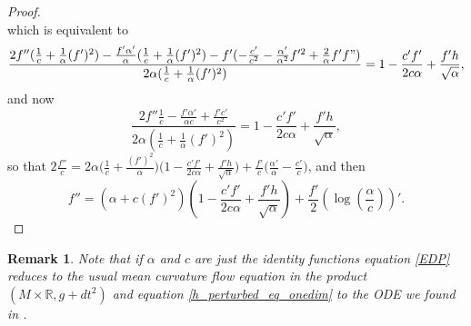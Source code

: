\documentclass[12pt]{article}
\newtheorem{remark}[lemma]{Remark}
\numberwithin{lemma}{section}
\begin{document}
{\begin{proof}
\[\]
which is equivalent to
\[
\frac{2f''(\frac{1}{c}+\frac{1}{\alpha}(f')^2)-\frac{f'\alpha'}{\alpha}(\frac{1}{c}+\frac{1}{\alpha}(f')^2)-f'(-\frac{c'}{c^2}-\frac{\alpha'}{\alpha^2}f'^2+\frac{2}{\alpha}f'f")}{2\alpha(\frac{1}{c}+\frac{1}{\alpha}(f')^2)}=1-\frac{c'f'}{ 2c\alpha} +\frac{f'h}{\sqrt{\alpha}},
\]
and now
\[
\frac{2f''\frac{1}{c}-\frac{f'\alpha'}{\alpha c}+\frac{f'c'}{c^2}}{2\alpha(\frac{1}{c}+\frac{1}{\alpha}(f')^2)}=1-\frac{c'f'}{ 2c\alpha} +\frac{f'h}{\sqrt{\alpha}},
\]
so that $2\frac{f''}{c}=2\alpha\Big(\frac{1}{c}+\frac{(f')^2}{\alpha}\Big)\Big( 1-\frac{c'f'}{ 2c\alpha} +\frac{f'h}{\sqrt{\alpha}}\Big) +\frac{f'}{c}\Big( \frac{\alpha'}{\alpha}-\frac{c'}{c}\Big)$, 
and then
\[
f''=\left(\alpha+c(f')^2\right)\left( 1-\frac{c'f'}{ 2c\alpha} +\frac{f'h}{\sqrt{\alpha}}\right) 
+\frac{f'}{2}\left(\log\left(\frac{\alpha}{c}\right)\right)'.
\]
\end{proof}
\begin{remark}
Note that if $\alpha$ and $c$ are just the identity functions equation \eqref{EDP} reduces to the usual mean curvature flow equation in  the product $(M\times\mathbb{R},g+dt^2)$ and equation \eqref{h_perturbed_eq_onedim} to the ODE we found in \cite{LO}.
\end{remark}


}
\end{document}
